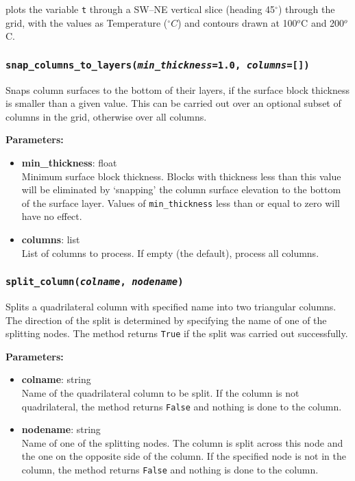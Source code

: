 plots the variable \texttt{t} through a SW--NE vertical slice (heading 45$^{\circ}$) through the grid, with the values as Temperature ($^{\circ}C$) and contours drawn at 100$^o$C and 200$^o$C.

\subsubsection{\texttt{snap\_columns\_to\_layers(\emph{min\_thickness}=1.0, \emph{columns}=[])}}

Snaps column surfaces to the bottom of their layers, if the surface block thickness is smaller than a given value.  This can be carried out over an optional subset of columns in the grid, otherwise over all columns.

\textbf{Parameters:}
\begin{itemize}
\item \textbf{min\_thickness}: float\\
  Minimum surface block thickness.  Blocks with thickness less than this value will be eliminated by `snapping' the column surface elevation to the bottom of the surface layer.  Values of \texttt{min\_thickness} less than or equal to zero will have no effect.
\item \textbf{columns}: list\\
  List of columns to process.  If empty (the default), process all columns.
\end{itemize}

\subsubsection{\texttt{split\_column(\emph{colname}, \emph{nodename})}}

Splits a quadrilateral column with specified name into two triangular columns.  The direction of the split is determined
by specifying the name of one of the splitting nodes.  The method returns \texttt{True} if the split was carried out successfully.

\textbf{Parameters:}
\begin{itemize}
\item \textbf{colname}: string\\
  Name of the quadrilateral column to be split.  If the column is not quadrilateral, the method returns \texttt{False} and nothing is done to the column.
\item \textbf{nodename}: string\\
  Name of one of the splitting nodes.  The column is split across this node and the one on the opposite side of the column.  If the specified node is not in the column, the method returns \texttt{False} and nothing is done to the column.
\end{itemize}

